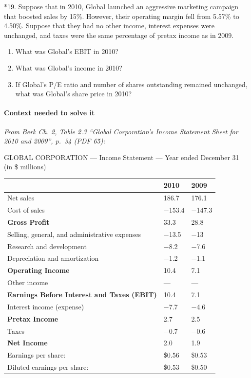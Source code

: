 \documentclass[11pt,a4paper]{article}
\begin{document}
*19. Suppose that in 2010, Global launched an aggressive marketing campaign that boosted sales by
15\%. However, their operating margin fell from 5.57\% to 4.50\%. Suppose that they had no other
income, interest expenses were unchanged, and taxes were the same percentage of pretax income as in
2009.

\begin{enumerate}
\def\labelenumi{\alph{enumi}.}
\item
  What was Global's EBIT in 2010?
\item
  What was Global's income in 2010?
\item
  If Global's P/E ratio and number of shares outstanding remained unchanged, what was Global's share
  price in 2010?
\end{enumerate}

\paragraph{Context needed to solve it}

\emph{From Berk Ch. 2, Table 2.3 ``Global Corporation's Income Statement Sheet for 2010 and 2009'',
p.~34 (PDF 65):}

GLOBAL CORPORATION --- Income Statement --- Year ended December 31 (in \$ millions)

{\def\LTcaptype{none} %
\begin{longtable}[]{@{}lll@{}}
\toprule\noalign{}
& 2010 & 2009 \\
\midrule\noalign{}
\endhead
\bottomrule\noalign{}
\endlastfoot
Net sales & 186.7 & 176.1 \\
Cost of sales & −153.4 & −147.3 \\
\textbf{Gross Profit} & 33.3 & 28.8 \\
Selling, general, and administrative expenses & −13.5 & −13 \\
Research and development & −8.2 & −7.6 \\
Depreciation and amortization & −1.2 & −1.1 \\
\textbf{Operating Income} & 10.4 & 7.1 \\
Other income & --- & --- \\
\textbf{Earnings Before Interest and Taxes (EBIT)} & 10.4 & 7.1 \\
Interest income (expense) & −7.7 & −4.6 \\
\textbf{Pretax Income} & 2.7 & 2.5 \\
Taxes & −0.7 & −0.6 \\
\textbf{Net Income} & 2.0 & 1.9 \\
Earnings per share: & \$0.56 & \$0.53 \\
Diluted earnings per share: & \$0.53 & \$0.50 \\
\end{longtable}
}
\end{document}
